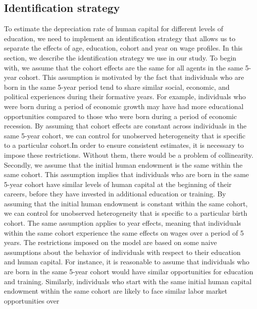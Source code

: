 \documentclass[12pt]{article}
\begin{document}
\subsection{Identification strategy}
To estimate the depreciation rate of human capital for different levels of education, we need to implement an
identification strategy that allows us to separate the effects of age, education, cohort and year on wage profiles. In
this section, we describe the identification strategy we use in our study.
\newline
To begin with, we assume that the cohort effects are the same for all agents in the same 5-year cohort. This assumption
is motivated by the fact that individuals who are born in the same 5-year period tend to share similar social, economic,
and political experiences during their formative years. For example, individuals who were born during a period of
economic growth may have had more educational opportunities compared to those who were born during a period of economic
recession. By assuming that cohort effects are constant across individuals in the same 5-year cohort, we can control for
unobserved heterogeneity that is specific to a particular cohort.In order to ensure consistent estimates, it is
necessary to impose these restrictions. Without them, there would be a problem of collinearity.
\newline
Secondly, we assume that the initial human endowment is the same within the same cohort. This assumption implies that
individuals who are born in the same 5-year cohort have similar levels of human capital at the beginning of their
careers, before they have invested in additional education or training. By assuming that the initial human endowment is
constant within the same cohort, we can control for unobserved heterogeneity that is specific to a particular birth
cohort.
\newline
The same assumption applies to year effects, meaning that individuals within the same cohort experience the same effects
on wages over a period of 5 years.
\newline
The restrictions imposed on the model are based on some naive assumptions about the behavior of individuals with respect
to their education and human capital. For instance, it is reasonable to assume that individuals who are born in the same
5-year cohort would have similar opportunities for education and training. Similarly, individuals who start with the
same initial human capital endowment within the same cohort are likely to face similar labor market opportunities over
\end{document}
